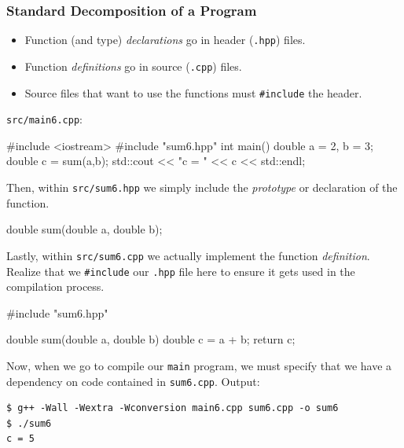 \documentclass[12pt,letterpaper,twoside]{article}
\begin{document}
\subsubsection{Standard Decomposition of a Program}
\begin{itemize}
\item
  Function (and type) \emph{declarations} go in header (\texttt{.hpp})
  files.
\item
  Function \emph{definitions} go in source (\texttt{.cpp}) files.
\item
  Source files that want to use the functions must \texttt{\#include}
  the header.
\end{itemize}

\texttt{src/main6.cpp}:

\begin{cpp}
#include <iostream> #include "sum6.hpp"
 int main() {
  double a = 2, b = 3;   double c = sum(a,b);
  std::cout << "c = " << c << std::endl;
} \end{cpp}

Then, within \texttt{src/sum6.hpp} we simply include the \emph{prototype} or 
declaration of the function.

\begin{cpp}
double sum(double a, double b);
\end{cpp}

Lastly, within \texttt{src/sum6.cpp} we actually implement the function \emph{definition}.
Realize that we \texttt{\#include} our \texttt{.hpp} file here to ensure it 
gets used in the compilation process.

\begin{cpp}
#include "sum6.hpp"

double sum(double a, double b) {
  double c = a + b;
  return c;
}
\end{cpp}

Now, when we go to compile our \texttt{main} program, we must specify that we have a 
dependency on code contained in \texttt{sum6.cpp}.
Output:

\begin{verbatim}
$ g++ -Wall -Wextra -Wconversion main6.cpp sum6.cpp -o sum6
$ ./sum6
c = 5
\end{verbatim}
\end{document}
